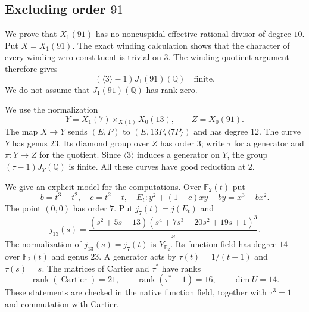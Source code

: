 \subsection{Excluding order $91$}\label{sec:decic91}
We prove that $X_1(91)$ has no noncuspidal effective rational divisor of degree $10$.
Put $X=X_1(91)$. The exact winding calculation shows that the character of
every winding-zero constituent is trivial on $3$. The winding-quotient
argument therefore gives
\[
 (\langle3\rangle-1)J_1(91)(\mathbb Q)\quad\text{finite}.
\]
We do not assume that $J_1(91)(\mathbb Q)$ has rank zero.

We use the normalization
\[
 Y=X_1(7)\mathbin{\times}_{X(1)}X_0(13),\qquad
 Z=X_0(91).
\]
The map $X\longrightarrow Y$ sends $(E,P)$ to
$(E,13P,\langle7P\rangle)$ and has degree $12$.
The curve $Y$ has genus $23$. Its diamond group over $Z$ has order $3$;
write $\tau$ for a generator and $\pi:Y\longrightarrow Z$ for the quotient.
Since $\langle3\rangle$ induces a generator on $Y$, the group
$(\tau-1)J_Y(\mathbb Q)$ is finite.
All these curves have good reduction at $2$.



We give an explicit model for the computations. Over $\mathbb F_2(t)$ put
\[
 b=t^3-t^2,\quad c=t^2-t,\quad
 E_t:y^2+(1-c)xy-by=x^3-bx^2.
\]
The point $(0,0)$ has order $7$. Put $j_7(t)=j(E_t)$ and
\[
 j_{13}(s)=
 \frac{(s^2+5s+13)(s^4+7s^3+20s^2+19s+1)^3}{s}.
\]
The normalization of $j_{13}(s)=j_7(t)$ is $Y_{\mathbb F_2}$.
Its function field has degree $14$ over $\mathbb F_2(t)$ and genus $23$.
A generator acts by $\tau(t)=1/(t+1)$ and $\tau(s)=s$.
The matrices of Cartier and $\tau^*$ have ranks
\[
 \operatorname{rank}(\operatorname{Cartier})=21,\qquad
 \operatorname{rank}(\tau^*-1)=16,\qquad \dim U=14.
\]
These statements are checked in the native function field, together with
$\tau^3=1$ and commutation with Cartier.

